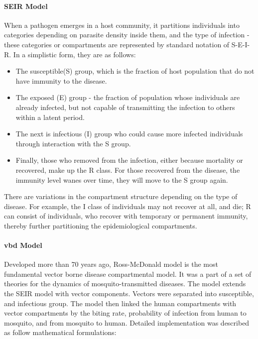 \documentclass[a4paper, 12pt, twoside]{article}
\begin{document}
\paragraph{SEIR Model}
When a pathogen emerges in a host community, it partitions individuals into categories depending on parasite density inside them, and the type of infection - these categories or compartments are represented by standard notation of S-E-I-R.
In a simplistic form, they are as follows: 
\begin{itemize}
  \item The susceptible(S) group, which is the fraction of host population that do not have immunity to the disease.
  \item The exposed (E) group - the fraction of population whose individuals are already infected, but not capable of transmitting the infection to others within a latent period.
  \item The next is infectious (I) group who could cause more infected individuals through interaction with the S group.
  \item Finally, those who removed from the infection, either because mortality or recovered, make up the R class. For those recovered from the disease, the immunity level wanes over time, they will move to the S group again.
\end{itemize}
There are variations in the compartment structure depending on the type of disease.
For example, the I class of individuals may not recover at all, and die; R can consist of individuals, who recover with temporary or permanent immunity, thereby further partitioning the epidemiological compartments.

\paragraph{\gls{vbd} Model}
Developed more than 70 years ago, Ross-McDonald model is the most fundamental vector borne disease compartmental model.
It was a part of a set of theories for the dynamics of mosquito-transmitted diseases.
The model extends the SEIR model with vector components.
Vectors were separated into susceptible, and infectious group.
The model then linked the human compartments with vector compartments by the biting rate, probability of infection from human to mosquito, and from mosquito to human.
Detailed implementation was described as follow mathematical formulations:
\end{document}

